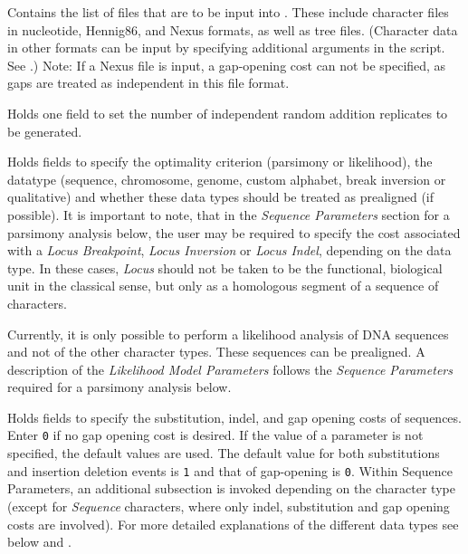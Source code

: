 \begin{description}
\setlength{\parindent}{0.5cm}
    \item[Input Files]
       	 Contains the list of files that are to be input into \poy. These include
       	character files in nucleotide, Hennig86, and Nexus formats, as well as tree files. 
       	(Character data in other formats can be input by specifying additional arguments in the script. 
      	 See .) Note: If a Nexus file is input, a gap-opening cost can not be specified, 
      	 as gaps are treated as independent in this file format.
    
    \item[Search Parameters]
        	Holds one field to set the number of independent random addition replicates to be generated.
    
    \item[Input Parameters]
    	Holds fields to specify the optimality criterion (parsimony or likelihood), the datatype 
	(sequence, chromosome, genome, custom alphabet, break inversion or qualitative) 
	and whether these data types should be treated as prealigned (if possible). It is important to note, that in 
	the \emph{Sequence Parameters} section for a parsimony analysis below, the user may be required 
	to specify the cost associated with a 	\emph{Locus Breakpoint}, \emph{Locus Inversion} or 
	\emph{Locus Indel}, depending on the data type. In these cases, \emph{Locus} should not be taken to be 
	the functional, biological unit in the classical sense, 	but only as a homologous segment of a 
	sequence of characters.
	
	\indent Currently, it is only possible to perform a likelihood analysis of DNA sequences and 
	not of the other character types. These sequences can be prealigned.  A description of the
	\emph{Likelihood Model Parameters} follows the \emph{Sequence Parameters} required for 
	a parsimony analysis below.
	
    \item[Sequence Parameters]
        Holds fields to specify the substitution, indel, and gap opening costs of sequences. Enter \texttt{0} if no
        gap opening cost is desired. If the value of a parameter is not specified, the default values 
        are used. The default value for both substitutions and insertion deletion events is \texttt{1} 
        and that of gap-opening is \texttt{0}. 
        Within Sequence Parameters, an additional subsection is invoked depending on the 
        character type (except for \emph{Sequence} characters, where only indel, substitution 
        and gap opening costs are involved).  For more detailed explanations of the different data types 
        see below and  .
\end{description}   
     
